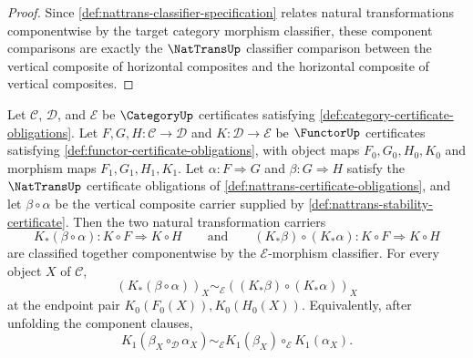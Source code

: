 \begin{proof}
Since \autoref{def:nattrans-classifier-specification} relates natural transformations componentwise by the target category morphism classifier, these component comparisons are exactly the $\NatTransUp$ classifier comparison between the vertical composite of horizontal composites and the horizontal composite of vertical composites.
\end{proof}

\begin{theorem}
\label{thm:functor-whiskering-preserves-vertical-composition}
Let $\mathcal C$, $\mathcal D$, and $\mathcal E$ be $\CategoryUp$ certificates satisfying \autoref{def:category-certificate-obligations}. Let $F,G,H:\mathcal C\to\mathcal D$ and $K:\mathcal D\to\mathcal E$ be $\FunctorUp$ certificates satisfying \autoref{def:functor-certificate-obligations}, with object maps $F_0,G_0,H_0,K_0$ and morphism maps $F_1,G_1,H_1,K_1$. Let $\alpha:F\Rightarrow G$ and $\beta:G\Rightarrow H$ satisfy the $\NatTransUp$ certificate obligations of \autoref{def:nattrans-certificate-obligations}, and let $\beta\circ\alpha$ be the vertical composite carrier supplied by \autoref{def:nattrans-stability-certificate}. Then the two natural transformation carriers
$$
K_{\ast}(\beta\circ\alpha):K\circ F\Rightarrow K\circ H
\qquad\text{and}\qquad
(K_{\ast}\beta)\circ(K_{\ast}\alpha):K\circ F\Rightarrow K\circ H
$$
are classified together componentwise by the $\mathcal E$-morphism classifier. For every object $X$ of $\mathcal C$,
$$
(K_{\ast}(\beta\circ\alpha))_X
\sim_{\mathcal E}
((K_{\ast}\beta)\circ(K_{\ast}\alpha))_X
$$
at the endpoint pair $K_0(F_0(X)),K_0(H_0(X))$. Equivalently, after unfolding the component clauses,
$$
K_1(\beta_X\circ_{\mathcal D}\alpha_X)
\sim_{\mathcal E}
K_1(\beta_X)\circ_{\mathcal E}K_1(\alpha_X).
$$
\end{theorem}
